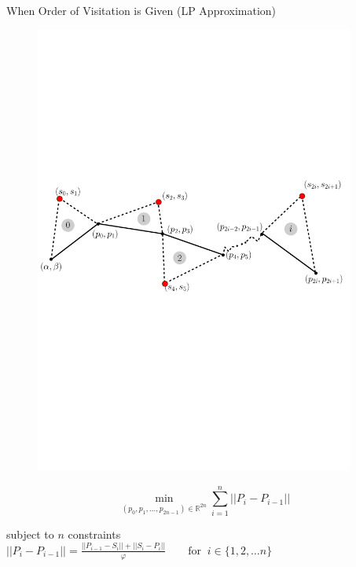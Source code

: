 \documentclass{beamer}
\begin{document}
\begin{frame}{When Order of Visitation is Given (LP Approximation)}
  \vspace{-25pt}
  \begin{figure}[H]
    \centering
    \includegraphics[width=10.5cm]{../img/lpdescr.pdf}
  \end{figure}
  \vspace{-10pt}
  $$\displaystyle \min_{(p_0,p_1,\ldots,p_{2n-1}) \in \mathbb{R}^{2n}}  \sum_{i=1}^{n}  || P_i - P_{i-1} ||$$

\vspace{-7pt}
subject to \(n\) constraints \\

\hspace{40pt}$||P_{i}-P_{i-1}||=\frac{ || P_{i-1}-S_{i}|| + ||S_{i}-P_{i}||}{\varphi}\qquad \text{for} \;\; i \in \{1,2,\ldots n\}$
\end{frame}
\end{document}
